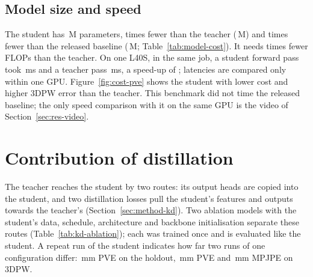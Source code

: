 \subsection{Model size and speed}



The student has \StudentParams\,M parameters, \ParamRatioStudent{} times fewer than the teacher (\FinalParams\,M) and
\ParamRatioStudentNAVER{} times fewer than the released baseline (\NAVERParams\,M; Table~\ref{tab:model-cost}). It
needs \FlopRatioStudent{} times fewer FLOPs than the teacher. On one L40S, in the same job, a student forward pass
took \StudentMsLFortyS\,ms and a teacher pass \TeacherMsLFortyS\,ms, a speed-up of \SpeedRatioStudent; latencies are
compared only within one GPU. Figure~\ref{fig:cost-pve} shows the student with lower cost and higher 3DPW error than
the teacher. This benchmark did not time the released baseline; the only speed comparison with it on the same GPU is
the video of Section~\ref{sec:res-video}.


\section{Contribution of distillation}
\label{sec:res-kd-ablation}



The teacher reaches the student by two routes: its output heads are copied into the student, and two distillation
losses pull the student's features and outputs towards the teacher's (Section~\ref{sec:method-kd}). Two ablation
models with the student's data, schedule, architecture and backbone initialisation separate these routes
(Table~\ref{tab:kd-ablation}); each was trained once and is evaluated like the student. A repeat run of the student
indicates how far two runs of one configuration differ: \KDNoiseHold\,mm PVE on the holdout, \KDNoiseTP\,mm PVE and
\AblRunDiffTPMPJPE\,mm MPJPE on 3DPW.

